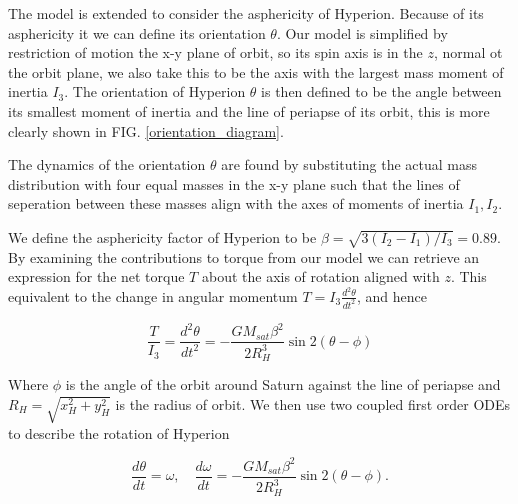 \documentclass[10pt, twocolumn]{article} %
\begin{document}
The model is extended to consider the asphericity of Hyperion. Because of its asphericity it we can define its orientation $\theta$. Our model is simplified by restriction of motion the x-y plane of orbit, so its spin axis is in the $z$, normal ot the orbit plane, we also take this to be the axis with the largest mass moment of inertia $I_3$. The orientation of Hyperion $\theta$ is then defined to be the angle between its smallest moment of inertia and the line of periapse of its orbit, this is more clearly shown in FIG. \ref{orientation_diagram}.

The dynamics of the orientation $\theta$ are found by substituting the actual mass distribution with four equal masses in the x-y plane such that the lines of seperation between these masses align with the axes of moments of inertia $I_1, I_2$.

We define the asphericity factor of Hyperion to be $\beta = \sqrt{3(I_2 - I_1)/I_3} = 0.89$. By examining the contributions to torque from our model we can retrieve an expression for the net torque $T$ about the axis of rotation aligned with $z$. This equivalent to the change in angular momentum $T = I_3 \frac{d^2\theta}{dt^2}$, and hence

\begin{equation}
    \frac{T}{I_3} = \frac{d^2\theta}{dt^2} = - \frac{GM_{sat}\beta^2}{2R_{H}^{3}}\sin 2(\theta - \phi)
\end{equation}

Where $\phi$ is the angle of the orbit around Saturn against the line of periapse and $R_H = \sqrt{x_H^2 + y_H^2}$ is the radius of orbit. We then use two coupled first order ODEs to describe the rotation of Hyperion

\begin{equation}
  \label{angle_ODEs}
  \frac{d\theta}{dt} = \omega, \quad \frac{d\omega}{dt} = - \frac{GM_{sat}\beta^2}{2R_{H}^{3}}\sin 2(\theta - \phi). 
\end{equation}
\end{document}
